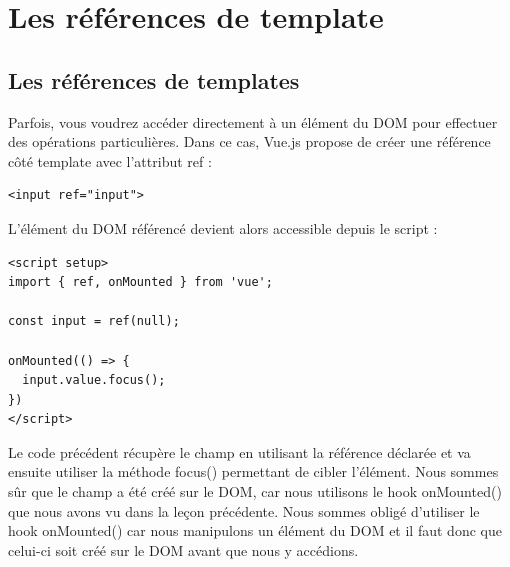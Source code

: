 

\section{Les références de template}
\subsection{Les références de {\color{monOrange}templates}}
Parfois, vous voudrez accéder directement à un élément du DOM pour effectuer des opérations particulières. Dans ce cas, {\color{monOrange}Vue.js} propose de créer une référence côté {\color{monOrange}template} avec l'attribut {\color{monOrange}ref }:
\begin{verbatim}
<input ref="input">
\end{verbatim}
L'élément du DOM référencé devient alors accessible depuis le {\color{monOrange}script} :
\begin{verbatim}
<script setup>
import { ref, onMounted } from 'vue';

const input = ref(null);

onMounted(() => {
  input.value.focus();
})
</script>
\end{verbatim}
Le code précédent récupère le champ en utilisant la référence déclarée et va ensuite utiliser la méthode {\color{monOrange}focus()} permettant de cibler l'élément. Nous sommes sûr que le champ a été créé sur le DOM, car nous utilisons le {\color{monOrange}hook onMounted()} que nous avons vu dans la leçon précédente. Nous sommes obligé d'utiliser le {\color{monOrange}hook onMounted()} car nous manipulons un élément du DOM et il faut donc que celui-ci soit créé sur le DOM avant que nous y accédions.

